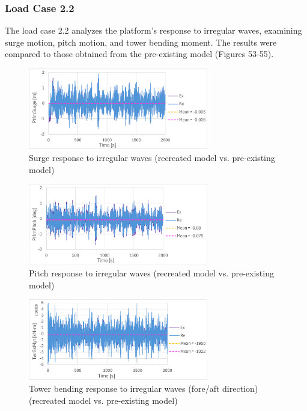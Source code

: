\documentclass[a4paper, 11pt]{article}
\begin{document}
\subsubsection{Load Case 2.2}
\hspace*{0.5cm}The load case 2.2 analyzes the platform's response to irregular waves, examining surge motion, pitch motion, and tower bending moment. The results were compared to those obtained from the pre-existing model (Figures 53-55). 

\begin{figure}[H]
    \centering
    \includegraphics[width=0.7\textwidth]{2.2_surge_mine.png}
    \caption{\small Surge response to irregular waves (recreated model vs. pre-existing model)}
    \label{fig:2.2_surge_mine}
\end{figure}

\begin{figure}[H]
    \centering
    \includegraphics[width=0.7\textwidth]{2.2_pitch_mine.png}
    \caption{\small Pitch response to irregular waves (recreated model vs. pre-existing model)}
    \label{fig:2.2_pitch_mine}
\end{figure}

\begin{figure}[H]
    \centering
    \includegraphics[width=0.7\textwidth]{2.2_twr_mine.png}
    \caption{\small Tower bending response to irregular waves (fore/aft direction) (recreated model vs. pre-existing model)}
    \label{fig:2.2_twr_mine}
\end{figure}
\end{document}
